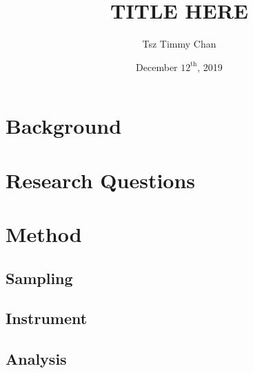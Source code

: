 \documentclass{LSRIarticle}
\title{TITLE HERE}	%
\author{Tsz Timmy Chan}	%
\date{December $12^{\text{th}}$, 2019}
\begin{document}
\section{Background}


\section{Research Questions}

\section{Method}
\subsection{Sampling}
\subsection{Instrument}
\subsection{Analysis}





\end{document}
